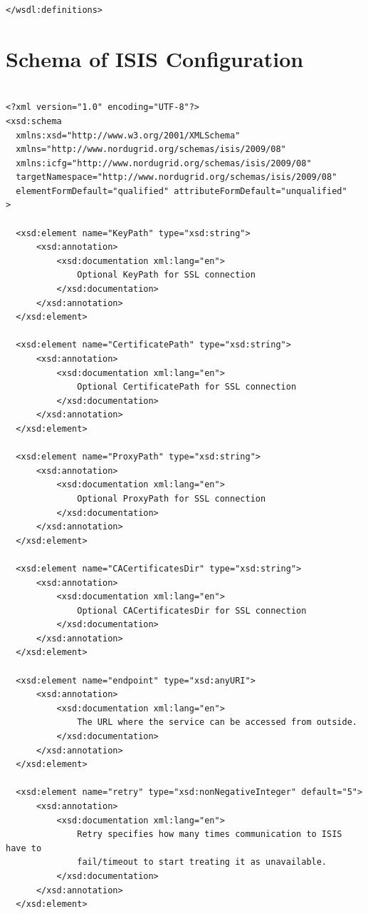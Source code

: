 \documentclass{book}
\begin{document}
\begin{verbatim}
</wsdl:definitions>
\end{verbatim}


\section{Schema of ISIS Configuration}
\label{annex:isis_configuration_schema}
\begin{verbatim}

<?xml version="1.0" encoding="UTF-8"?>
<xsd:schema
  xmlns:xsd="http://www.w3.org/2001/XMLSchema"
  xmlns="http://www.nordugrid.org/schemas/isis/2009/08"
  xmlns:icfg="http://www.nordugrid.org/schemas/isis/2009/08"
  targetNamespace="http://www.nordugrid.org/schemas/isis/2009/08"
  elementFormDefault="qualified" attributeFormDefault="unqualified"
>

  <xsd:element name="KeyPath" type="xsd:string">
      <xsd:annotation>
          <xsd:documentation xml:lang="en">
              Optional KeyPath for SSL connection
          </xsd:documentation>
      </xsd:annotation>
  </xsd:element>

  <xsd:element name="CertificatePath" type="xsd:string">
      <xsd:annotation>
          <xsd:documentation xml:lang="en">
              Optional CertificatePath for SSL connection
          </xsd:documentation>
      </xsd:annotation>
  </xsd:element>

  <xsd:element name="ProxyPath" type="xsd:string">
      <xsd:annotation>
          <xsd:documentation xml:lang="en">
              Optional ProxyPath for SSL connection
          </xsd:documentation>
      </xsd:annotation>
  </xsd:element>

  <xsd:element name="CACertificatesDir" type="xsd:string">
      <xsd:annotation>
          <xsd:documentation xml:lang="en">
              Optional CACertificatesDir for SSL connection
          </xsd:documentation>
      </xsd:annotation>
  </xsd:element>

  <xsd:element name="endpoint" type="xsd:anyURI">
      <xsd:annotation>
          <xsd:documentation xml:lang="en">
              The URL where the service can be accessed from outside.
          </xsd:documentation>
      </xsd:annotation>
  </xsd:element>

  <xsd:element name="retry" type="xsd:nonNegativeInteger" default="5">
      <xsd:annotation>
          <xsd:documentation xml:lang="en">
              Retry specifies how many times communication to ISIS have to 
              fail/timeout to start treating it as unavailable.
          </xsd:documentation>
      </xsd:annotation>
  </xsd:element>


\end{verbatim}
\end{document}
